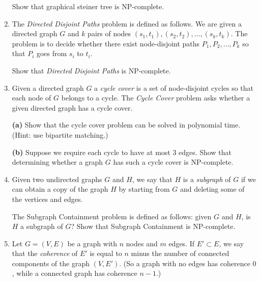 \documentclass[12pt]{article}
\begin{document}
\begin{enumerate}
Show that {\sc graphical steiner tree} is NP-complete.



\item \label{hw-np-paths}

The {\em Directed Disjoint Paths} problem is defined as follows.
We are given a directed graph $G$ and $k$ pairs of nodes 
$(s_1, t_1), (s_2, t_2), \ldots, (s_k, t_k)$.
The problem is to decide whether there exist
node-disjoint paths $P_1, P_2, \ldots, P_k$
so that $P_i$ goes from $s_i$ to $t_i$.

Show that {\em Directed Disjoint Paths} is NP-complete.


\item 

Given a directed graph $G$ a {\em cycle cover} 
is a set of node-disjoint cycles so that each node of $G$ belongs to a cycle. 
The {\em Cycle Cover} problem asks whether a given directed
graph has a cycle cover.

{\bf (a)} Show that the cycle cover problem can be solved in polynomial time. 
(Hint: use bipartite matching.)

{\bf (b)\Star} Suppose we require each cycle to have at most $3$ edges.
Show that determining whether a graph $G$ has such a cycle cover is
NP-complete.





\item 

Given two undirected graphs $G$ and $H$, we say
that $H$ is a {\em subgraph} of $G$ if we can obtain a copy of
the graph $H$ by starting from $G$ and deleting some
of the vertices and edges.

The {\sc Subgraph Containment} problem is defined as follows:
given $G$ and $H$, is $H$ a subgraph of $G$?
Show that {\sc Subgraph Containment} is NP-complete.


\item 

Let $G = (V,E)$ be a graph
with $n$ nodes and $m$ edges.
If $E' \subset E$, we say that the {\em coherence} of
$E'$ is equal to $n$ minus the number of connected
components of the graph $(V,E')$.
(So a graph with no edges has coherence $0$,
while a connected graph has coherence $n-1$.)


\end{enumerate}
\end{document}
